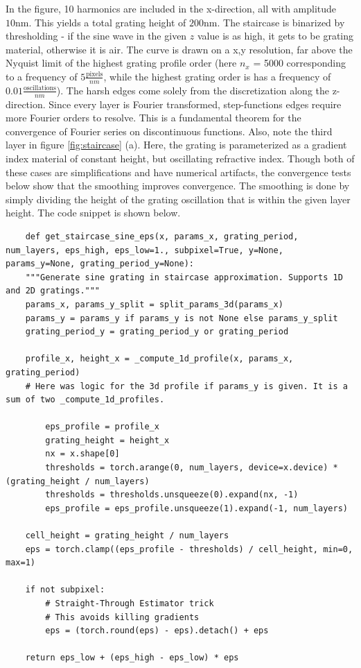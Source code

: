 In the figure, 10 harmonics are included in the x-direction, all with amplitude $10 \text{nm}$. This yields a total grating height of $200 \text{nm}$. The staircase is binarized by thresholding - if the sine wave in the given $z$ value is as high, it gets to be grating material, otherwise it is air. The curve is drawn on a x,y resolution, far above the Nyquist limit of the highest grating profile order (here $n_x$ = 5000 corresponding to a frequency of $5\frac{\text{pixels}}{nm}$, while the highest grating order is has a frequency of $0.01\frac{\text{oscillations}}{nm}$).
The harsh edges come solely from the discretization along the z-direction. Since every layer is Fourier transformed, step-functions edges require more Fourier orders to resolve. This is a fundamental theorem for the convergence of Fourier series on discontinuous functions. Also, note the third layer in figure \ref{fig:staircase}  (a). Here, the grating is parameterized as a gradient index material of constant height, but oscillating refractive index. Though both of these cases are simplifications and have numerical artifacts, the convergence tests below show that the smoothing improves convergence. The smoothing is done by simply dividing the height of the grating oscillation that is within the given layer height. The code snippet is shown below.
\begin{lstlisting}
    def get_staircase_sine_eps(x, params_x, grating_period, num_layers, eps_high, eps_low=1., subpixel=True, y=None, params_y=None, grating_period_y=None):
    """Generate sine grating in staircase approximation. Supports 1D and 2D gratings."""
    params_x, params_y_split = split_params_3d(params_x)
    params_y = params_y if params_y is not None else params_y_split
    grating_period_y = grating_period_y or grating_period
    
    profile_x, height_x = _compute_1d_profile(x, params_x, grating_period)
    # Here was logic for the 3d profile if params_y is given. It is a sum of two _compute_1d_profiles.

        eps_profile = profile_x
        grating_height = height_x
        nx = x.shape[0]
        thresholds = torch.arange(0, num_layers, device=x.device) * (grating_height / num_layers)
        thresholds = thresholds.unsqueeze(0).expand(nx, -1)
        eps_profile = eps_profile.unsqueeze(1).expand(-1, num_layers)

    cell_height = grating_height / num_layers
    eps = torch.clamp((eps_profile - thresholds) / cell_height, min=0, max=1)
    
    if not subpixel:
        # Straight-Through Estimator trick
        # This avoids killing gradients
        eps = (torch.round(eps) - eps).detach() + eps
        
    return eps_low + (eps_high - eps_low) * eps
\end{lstlisting}
